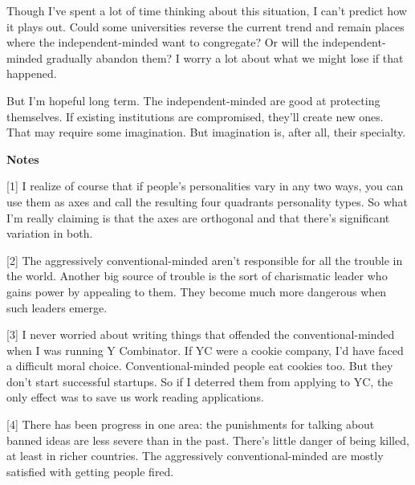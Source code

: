 Though I've spent a lot of time thinking about
                  this situation, I can't predict how it plays out. Could some
                  universities reverse the current trend and remain places where
                  the independent-minded want to congregate? Or will the
                  independent-minded gradually abandon them? I worry a lot about
                  what we might lose if that happened.

But I'm
                  hopeful long term. The independent-minded are good at
                  protecting themselves. If existing institutions are
                  compromised, they'll create new ones. That may require some
                  imagination. But imagination is, after all, their
                  specialty.














                  \textbf{Notes}

[1] I realize of course that if people's personalities vary in
                  any two ways, you can use them as axes and call the resulting
                  four quadrants personality types. So what I'm really claiming
                  is that the axes are orthogonal and that there's significant
                  variation in both.

[2] The aggressively conventional-minded aren't responsible for
                  all the trouble in the world. Another big source of trouble is
                  the sort of charismatic leader who gains power by appealing to
                  them. They become much more dangerous when such leaders
                  emerge.

[3] I never worried about writing things that offended the
                  conventional-minded when I was running Y Combinator. If YC
                  were a cookie company, I'd have faced a difficult moral
                  choice. Conventional-minded people eat cookies too. But they
                  don't start successful startups. So if I deterred them from
                  applying to YC, the only effect was to save us work reading
                  applications.

[4] There has been progress in one area: the punishments for
                  talking about banned ideas are less severe than in the past.
                  There's little danger of being killed, at least in richer
                  countries. The aggressively conventional-minded are mostly
                  satisfied with getting people fired.

